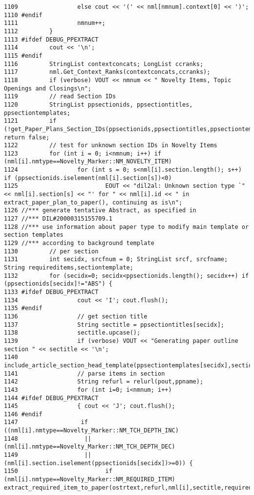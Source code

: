 \begin{verbatim}
1109                 else cout << '(' << nml[nmnum].context[0] << ')';
1110 #endif
1111                 nmnum++;
1112         }
1113 #ifdef DEBUG_PPEXTRACT
1114         cout << '\n';
1115 #endif
1116         StringList contextconcats; LongList ccranks;
1117         nml.Get_Context_Ranks(contextconcats,ccranks);
1118         if (verbose) VOUT << nmnum << " Novelty Items, Topic Openings and Closings\n";
1119         // read Section IDs
1120         StringList ppsectionids, ppsectiontitles, ppsectiontemplates;
1121         if (!get_Paper_Plans_Section_IDs(ppsectionids,ppsectiontitles,ppsectiontemplates)) return false;
1122         // test for unknown section IDs in Novelty Items
1123         for (int i = 0; i<nmnum; i++) if (nml[i].nmtype==Novelty_Marker::NM_NOVELTY_ITEM)
1124                 for (int s = 0; s<nml[i].section.length(); s++) if (ppsectionids.iselement(nml[i].section[s])<0)
1125                         EOUT << "dil2al: Unknown section type `" << nml[i].section[s] << "' for " << nml[i].id << " in extract_paper_plan_to_paper(), continuing as is\n";
1126 //*** generate tentative Abstract, as specified in
1127 //*** DIL#20000315155709.1
1128 //*** use information about paper type to modify main template or section templates
1129 //*** according to background template
1130         // per section
1131         int secidx, srcfnum = 0; StringList srcf, srcfname; String requireditems,sectiontemplate;
1132         for (secidx=0; secidx<ppsectionids.length(); secidx++) if (ppsectionids[secidx]!="ABS") {
1133 #ifdef DEBUG_PPEXTRACT
1134                 cout << 'I'; cout.flush();
1135 #endif
1136                 // get section title
1137                 String sectitle = ppsectiontitles[secidx];
1138                 sectitle.upcase();
1139                 if (verbose) VOUT << "Generating paper outline section " << sectitle << '\n';
1140                 include_article_section_head_template(ppsectiontemplates[secidx],sectiontemplate,ostrtext,pprevtext);
1141                 // parse items in section
1142                 String refurl = relurl(pout,ppname);
1143                 for (int i=0; i<nmnum; i++)
1144 #ifdef DEBUG_PPEXTRACT
1145                 { cout << 'J'; cout.flush();
1146 #endif
1147                  if ((nml[i].nmtype==Novelty_Marker::NM_TCH_DEPTH_INC)
1148                   || (nml[i].nmtype==Novelty_Marker::NM_TCH_DEPTH_DEC)
1149                   || (nml[i].section.iselement(ppsectionids[secidx])>=0)) {
1150                         if (nml[i].nmtype==Novelty_Marker::NM_REQUIRED_ITEM) extract_required_item_to_paper(ostrtext,refurl,nml[i],sectitle,requireditems,pprevtext);

\end{verbatim}

